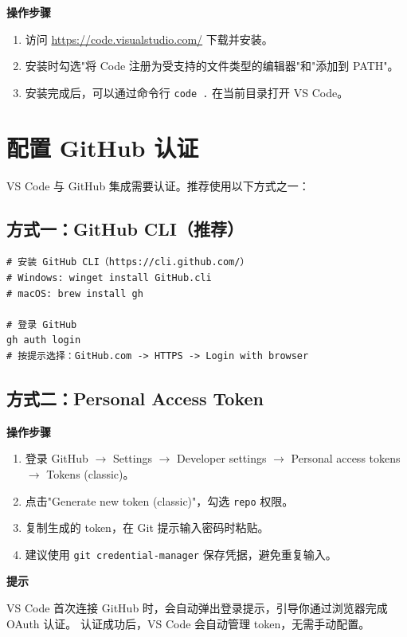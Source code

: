 \documentclass[12pt,a4paper,openany]{ctexbook}
\newenvironment{tipbox}{%
  \medskip
  \noindent\textbf{\faLightbulb\; 提示}
  \smallskip
}{%
  \medskip
}
\newenvironment{stepbox}{%
  \medskip
  \noindent\textbf{\faCogs\; 操作步骤}
  \smallskip
}{%
  \medskip
}
\begin{document}
\begin{stepbox}
\begin{enumerate}[leftmargin=1.5em]
  \item 访问 \url{https://code.visualstudio.com/} 下载并安装。
  \item 安装时勾选"将 Code 注册为受支持的文件类型的编辑器"和"添加到 PATH"。
  \item 安装完成后，可以通过命令行 \texttt{code .} 在当前目录打开 VS Code。
\end{enumerate}
\end{stepbox}

\section{配置 GitHub 认证}

VS Code 与 GitHub 集成需要认证。推荐使用以下方式之一：

\subsection{方式一：GitHub CLI（推荐）}

\begin{lstlisting}[style=shell]
# 安装 GitHub CLI（https://cli.github.com/）
# Windows: winget install GitHub.cli
# macOS: brew install gh

# 登录 GitHub
gh auth login
# 按提示选择：GitHub.com -> HTTPS -> Login with browser
\end{lstlisting}

\subsection{方式二：Personal Access Token}

\begin{stepbox}
\begin{enumerate}[leftmargin=1.5em]
  \item 登录 GitHub $\to$ Settings $\to$ Developer settings $\to$
        Personal access tokens $\to$ Tokens (classic)。
  \item 点击"Generate new token (classic)"，勾选 \texttt{repo} 权限。
  \item 复制生成的 token，在 Git 提示输入密码时粘贴。
  \item 建议使用 \texttt{git credential-manager} 保存凭据，避免重复输入。
\end{enumerate}
\end{stepbox}

\begin{tipbox}
VS Code 首次连接 GitHub 时，会自动弹出登录提示，引导你通过浏览器完成 OAuth 认证。
认证成功后，VS Code 会自动管理 token，无需手动配置。
\end{tipbox}
\end{document}
